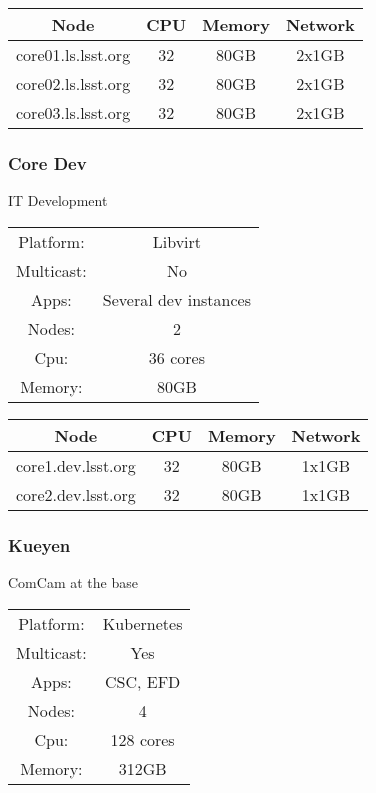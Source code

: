 \begin{center}
  \begin{tabular}{||c c c c||} 
    \hline
    Node & CPU & Memory & Network \\ [0.5ex] 
    \hline\hline
    core01.ls.lsst.org & 32 & 80GB & 2x1GB \\
    \hline
    core02.ls.lsst.org & 32 & 80GB & 2x1GB \\
    \hline
    core03.ls.lsst.org & 32 & 80GB & 2x1GB \\
    \hline
  \end{tabular}
\end{center}

\subsubsection{Core Dev}

IT Development

\begin{center}
  \begin{tabular}{ |c|c| } 
   \hline
   Platform: & Libvirt \\ 
   Multicast: & No \\ 
   Apps: & Several dev instances \\ 
   Nodes: & 2 \\ 
   Cpu: & 36 cores \\ 
   Memory: & 80GB \\ 
   \hline
  \end{tabular}
\end{center}

\begin{center}
  \begin{tabular}{||c c c c||} 
    \hline
    Node & CPU & Memory & Network \\ [0.5ex] 
    \hline\hline
    core1.dev.lsst.org & 32 & 80GB & 1x1GB \\
    \hline
    core2.dev.lsst.org & 32 & 80GB & 1x1GB \\
    \hline
  \end{tabular}
\end{center}

\newpage
\subsubsection{Kueyen}

ComCam at the base

\begin{center}
  \begin{tabular}{ |c|c| } 
   \hline
   Platform: & Kubernetes \\ 
   Multicast: & Yes \\ 
   Apps: & CSC, EFD \\ 
   Nodes: & 4 \\ 
   Cpu: & 128 cores \\ 
   Memory: & 312GB \\ 
   \hline
  \end{tabular}
\end{center}

